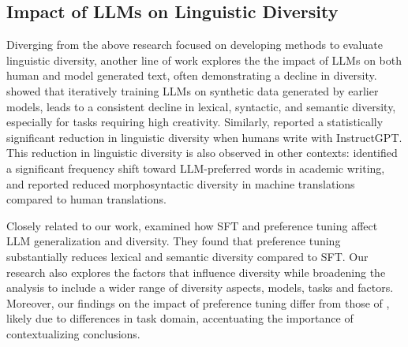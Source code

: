 \documentclass[11pt,a4paper]{article}
\begin{document}
\subsection{Impact of LLMs on Linguistic Diversity}
Diverging from the above research focused on developing methods to evaluate linguistic diversity, another line of work explores the the impact of LLMs on both human and model generated text, often demonstrating a decline in diversity. \citet{guo-etal-2024-curious} showed that iteratively training LLMs on synthetic data generated by earlier models, leads to a consistent decline in lexical, syntactic, and semantic diversity, especially for tasks requiring high creativity. Similarly, \citet{padmakumar2024does} reported a statistically significant reduction in linguistic diversity when humans write with InstructGPT. This reduction in linguistic diversity is also observed in other contexts: \citet{liang2024mapping} identified a significant frequency shift toward LLM-preferred words in academic writing, and \citet{luo-etal-2024-diverge} reported reduced morphosyntactic diversity in machine translations compared to human translations.

Closely related to our work, \citet{kirk2024understanding} examined how SFT and preference tuning affect LLM generalization and diversity. They found that preference tuning substantially reduces lexical and semantic diversity compared to SFT. Our research also explores the factors that influence diversity while broadening the analysis to include a wider range of diversity aspects, models, tasks and factors. Moreover, our findings on the impact of preference tuning differ from those of \citet{kirk2024understanding}, likely due to differences in task domain, accentuating the importance of contextualizing conclusions.

\end{document}
